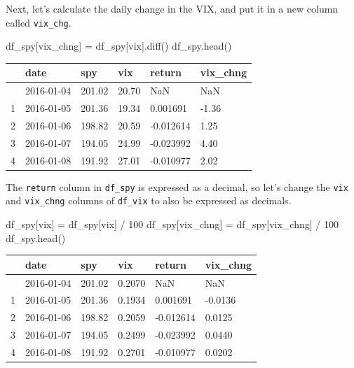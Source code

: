 \documentclass[
  letterpaper,
  DIV=11,
  numbers=noendperiod]{scrreprt}
\newenvironment{Shaded}{\begin{snugshade}}{\end{snugshade}}
\newcommand{\DecValTok}[1]{\textcolor[rgb]{0.68,0.00,0.00}{#1}}
\newcommand{\NormalTok}[1]{\textcolor[rgb]{0.00,0.23,0.31}{#1}}
\newcommand{\OperatorTok}[1]{\textcolor[rgb]{0.37,0.37,0.37}{#1}}
\newcommand{\StringTok}[1]{\textcolor[rgb]{0.13,0.47,0.30}{#1}}
\begin{document}
Next, let's calculate the daily change in the VIX, and put it in a new
column called \texttt{vix\_chg}.

\begin{Shaded}
\begin{Highlighting}[]
\NormalTok{df\_spy[}\StringTok{\textquotesingle{}vix\_chng\textquotesingle{}}\NormalTok{] }\OperatorTok{=}\NormalTok{ df\_spy[}\StringTok{\textquotesingle{}vix\textquotesingle{}}\NormalTok{].diff()}
\NormalTok{df\_spy.head()}
\end{Highlighting}
\end{Shaded}

\begin{longtable}[]{@{}llllll@{}}
\toprule\noalign{}
& date & spy & vix & return & vix\_chng \\
\midrule\noalign{}
\endhead
\bottomrule\noalign{}
\endlastfoot
0 & 2016-01-04 & 201.02 & 20.70 & NaN & NaN \\
1 & 2016-01-05 & 201.36 & 19.34 & 0.001691 & -1.36 \\
2 & 2016-01-06 & 198.82 & 20.59 & -0.012614 & 1.25 \\
3 & 2016-01-07 & 194.05 & 24.99 & -0.023992 & 4.40 \\
4 & 2016-01-08 & 191.92 & 27.01 & -0.010977 & 2.02 \\
\end{longtable}

The \texttt{return} column in \texttt{df\_spy} is expressed as a
decimal, so let's change the \texttt{vix} and \texttt{vix\_chng} columns
of \texttt{df\_vix} to also be expressed as decimals.

\begin{Shaded}
\begin{Highlighting}[]
\NormalTok{df\_spy[}\StringTok{\textquotesingle{}vix\textquotesingle{}}\NormalTok{] }\OperatorTok{=}\NormalTok{ df\_spy[}\StringTok{\textquotesingle{}vix\textquotesingle{}}\NormalTok{] }\OperatorTok{/} \DecValTok{100}
\NormalTok{df\_spy[}\StringTok{\textquotesingle{}vix\_chng\textquotesingle{}}\NormalTok{] }\OperatorTok{=}\NormalTok{ df\_spy[}\StringTok{\textquotesingle{}vix\_chng\textquotesingle{}}\NormalTok{] }\OperatorTok{/} \DecValTok{100}
\NormalTok{df\_spy.head()}
\end{Highlighting}
\end{Shaded}

\begin{longtable}[]{@{}llllll@{}}
\toprule\noalign{}
& date & spy & vix & return & vix\_chng \\
\midrule\noalign{}
\endhead
\bottomrule\noalign{}
\endlastfoot
0 & 2016-01-04 & 201.02 & 0.2070 & NaN & NaN \\
1 & 2016-01-05 & 201.36 & 0.1934 & 0.001691 & -0.0136 \\
2 & 2016-01-06 & 198.82 & 0.2059 & -0.012614 & 0.0125 \\
3 & 2016-01-07 & 194.05 & 0.2499 & -0.023992 & 0.0440 \\
4 & 2016-01-08 & 191.92 & 0.2701 & -0.010977 & 0.0202 \\
\end{longtable}
\end{document}
